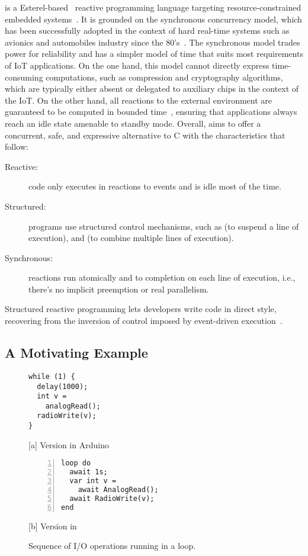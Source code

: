 \CEU is a Esterel-based~\cite{ceu.tecs17} reactive programming language
targeting resource-constrained embedded systems~\cite{ceu.sensys13}.
%
It is grounded on the synchronous concurrency model, which has been
successfully adopted in the context of hard real-time systems such as avionics
and automobiles industry since the 80's~\cite{rp.twelve}.
%
The synchronous model trades power for reliability and has a simpler model
of time that suits most requirements of IoT applications.
%
On the one hand, this model cannot directly express time-consuming
computations, such as compression and cryptography algorithms, which are
typically either absent or delegated to auxiliary chips in the context of the
IoT.
%
On the other hand, all reactions to the external environment are guaranteed to
be computed in bounded time~\cite{ceu.sensys13}, ensuring that applications
always reach an idle state amenable to standby mode.
%
Overall, \CEU aims to offer a concurrent, safe, and expressive alternative to C
with the characteristics that follow:
%
\begin{description}
\item [Reactive:] code only executes in reactions to events and is idle most of
    the time.
\item [Structured:] programs use structured control mechanisms, such as
     (to suspend a line of execution), and  (to combine
    multiple lines of execution).
\item [Synchronous:] reactions run atomically and to completion on each line of
    execution, i.e., there's no implicit preemption or real parallelism.
\end{description}
%
Structured reactive programming lets developers write code in direct style,
recovering from the inversion of control imposed by event-driven
execution~\cite{rp.deprecating,rp.rescala,sync_async.cooperative}.

\subsection*{A Motivating Example}
\label{sec.ceu.example}

{\linespread{1}
\begin{figure}[t]
\begin{minipage}[t]{0.49\linewidth}
\begin{lstlisting}[xrightmargin=0.5cm]
while (1) {
  delay(1000);
  int v =
    analogRead();
  radioWrite(v);
}
\end{lstlisting}
\centering\small{[a] Version in Arduino}
\end{minipage}
%
\begin{minipage}[t]{0.49\linewidth}
\begin{lstlisting}[numbers=left,xleftmargin=-0.2cm]
loop do
  await 1s;
  var int v =
    await AnalogRead();
  await RadioWrite(v);
end
\end{lstlisting}
\centering\small{[b] Version in \CEU}
\end{minipage}
\caption{ Sequence of I/O operations running in a loop.
\label{lst.direct}
}
\end{figure}
}

